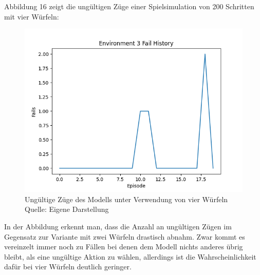 Abbildung 16 zeigt die ungültigen Züge einer Spielsimulation von 200 Schritten mit vier Würfeln:
\nopagebreak
\begin{figure}[H]
	\includegraphics[width=1\textwidth]{Bilder/failswithfourdice} 
	\caption[Ungültige Züge des Modells unter Verwendung von vier Würfeln]{Ungültige Züge des Modells unter Verwendung von vier Würfeln\\ Quelle: Eigene Darstellung}
\end{figure}

In der Abbildung erkennt man, dass die Anzahl an ungültigen Zügen im Gegensatz zur Variante mit zwei Würfeln drastisch abnahm. Zwar kommt es vereinzelt immer noch zu Fällen bei denen dem Modell nichts anderes übrig bleibt, als eine ungültige Aktion zu wählen, allerdings ist die Wahrscheinlichkeit dafür bei vier Würfeln deutlich geringer.
